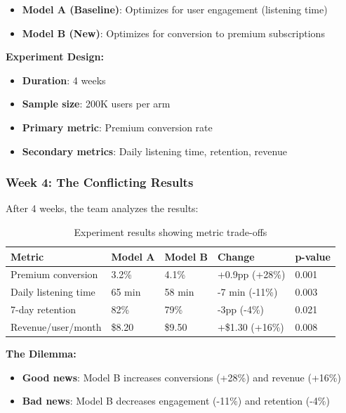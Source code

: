 \begin{itemize}
    \item \textbf{Model A (Baseline)}: Optimizes for user engagement (listening time)
    \item \textbf{Model B (New)}: Optimizes for conversion to premium subscriptions
\end{itemize}

\textbf{Experiment Design:}
\begin{itemize}
    \item \textbf{Duration}: 4 weeks
    \item \textbf{Sample size}: 200K users per arm
    \item \textbf{Primary metric}: Premium conversion rate
    \item \textbf{Secondary metrics}: Daily listening time, retention, revenue
\end{itemize}

\subsubsection{Week 4: The Conflicting Results}

After 4 weeks, the team analyzes the results:

\begin{table}[h]
\centering
\begin{tabular}{lllll}
\toprule
\textbf{Metric} & \textbf{Model A} & \textbf{Model B} & \textbf{Change} & \textbf{p-value} \\
\midrule
Premium conversion & 3.2\% & 4.1\% & +0.9pp (+28\%) & 0.001 \\
Daily listening time & 65 min & 58 min & -7 min (-11\%) & 0.003 \\
7-day retention & 82\% & 79\% & -3pp (-4\%) & 0.021 \\
Revenue/user/month & \$8.20 & \$9.50 & +\$1.30 (+16\%) & 0.008 \\
\bottomrule
\end{tabular}
\caption{Experiment results showing metric trade-offs}
\end{table}

\textbf{The Dilemma:}
\begin{itemize}
    \item \textbf{Good news}: Model B increases conversions (+28\%) and revenue (+16\%)
    \item \textbf{Bad news}: Model B decreases engagement (-11\%) and retention (-4\%)
\end{itemize}

